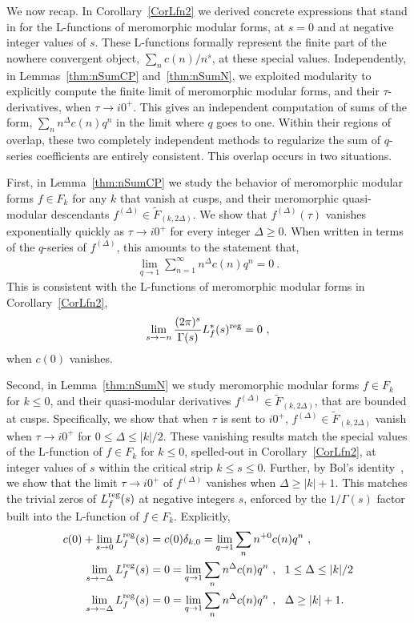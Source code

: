 \documentclass[11pt,a4paper]{article}
\newcommand{\G}{\Gamma}
\newcommand{\reg}{{\rm reg}}
\begin{document}
We now recap. In Corollary~\ref{CorLfn2} we derived concrete expressions that stand in for the L-functions of meromorphic modular forms, at $s = 0$ and at negative integer values of $s$. These L-functions formally represent the finite part of the nowhere convergent object, $\sum_n c(n)/n^s$, at these special values. Independently, in Lemmas~\ref{thm:nSumCP} and~\ref{thm:nSumN}, we exploited modularity to explicitly compute the finite limit of meromorphic modular forms, and their $\tau$-derivatives, when $\tau \to i 0^+$. This gives an independent computation of sums of the form, $\sum_n n^{\Delta} c(n) q^n$ in the limit where $q$ goes to one. Within their regions of overlap, these two completely independent methods to regularize the sum of $q$-series coefficients are entirely consistent. This overlap occurs in two situations. 

First, in Lemma~\ref{thm:nSumCP} we study the behavior of meromorphic modular forms $f \in F_k$ for any $k$ that vanish at cusps, and their meromorphic quasi-modular descendants $f^{(\Delta)} \in \tilde{F}_{(k,2 \Delta)}$. We show that $f^{(\Delta)}(\tau)$ vanishes exponentially quickly as $\tau \to i 0^+$ for every integer $\Delta \geq 0$. When written in terms of the $q$-series of $f^{(\Delta)}$, this amounts to the statement that,
\begin{align}
\lim_{q \to 1} \sum_{n = 1}^{\infty} n^{\Delta} c(n) q^n = 0~.
\end{align}
This is consistent with the L-functions of meromorphic modular forms in Corollary~\ref{CorLfn2},
\begin{align}
\lim_{s \to -n} \frac{(2\pi)^s}{\G(s)} L_f^*(s)^\reg = 0~,
\end{align}
when $c(0)$ vanishes.

Second, in Lemma~\ref{thm:nSumN} we study meromorphic modular forms $f \in F_k$ for $k \leq 0$, and their quasi-modular derivatives $f^{(\Delta)} \in \tilde{F}_{(k,2 \Delta)}$, that are bounded at cusps. Specifically, we show that when $\tau$ is sent to $i 0^+$, $f^{(\Delta)} \in \tilde{F}_{(k,2 \Delta)}$ vanish when $\tau \to i 0^+$ for $0 \leq \Delta \leq |k|/2$. These vanishing results match the special values of the L-function of $f \in F_k$ for $k \leq 0$, spelled-out in Corollary~\ref{CorLfn2}, at integer values of $s$ within the critical strip $k \leq s \leq 0$. Further, by Bol's identity~\cite{26-Bol1}, we show that the limit $\tau \to i 0^+$ of $f^{(\Delta)}$ vanishes when $\Delta \geq |k|+1$. This matches the trivial zeros of $L_f^\reg(s)$ at negative integers $s$, enforced by the $1/\G(s)$ factor built into the L-function of $f \in F_k$. Explicitly,
\begin{align}
c(0) + \lim_{s \to 0} L_f^\reg(s) & = c(0) \delta_{k,0} = \lim_{q \to 1} \sum_n n^{+0} c(n) q^n~,~ \\ 
\lim_{s \to -\Delta} L_f^\reg(s) & = 0= \lim_{q \to 1} \sum_n n^{\Delta} c(n) q^n  ~,~~1 \leq \Delta \leq |k|/2 \\
\lim_{s \to -\Delta} L_f^\reg(s) & = 0= \lim_{q \to 1} \sum_n n^{\Delta} c(n) q^n ~,~~\Delta \geq |k|+1 .
\end{align} 
\end{document}

